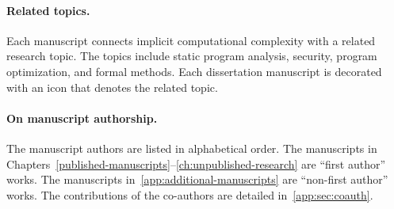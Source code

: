 \begin{description}
      
\end{description}

\paragraph*{Related topics.}
Each manuscript connects implicit computational complexity with a related research topic.
The topics include static program analysis, security, program optimization, and formal methods.
Each dissertation manuscript is decorated with an icon that denotes the related topic.

\paragraph*{On manuscript authorship.}
The manuscript authors are listed in alphabetical order.
The manuscripts in Chapters~\ref{published-manuscripts}--\ref{ch:unpublished-research} are \enquote{first author} works.
The manuscripts in~\autoref{app:additional-manuscripts} are \enquote{non-first author} works.
The contributions of the co-authors are detailed in~\autoref{app:sec:coauth}.

